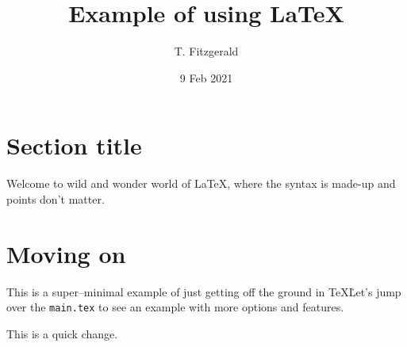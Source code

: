 \documentclass[letterpaper,10pt,twoside]{article}
\title{Example of using \LaTeX}
\date{9 Feb 2021}
\author{T. Fitzgerald}
\begin{document}
\maketitle

\section{Section title}
Welcome to wild and wonder world of \LaTeX , where the syntax is made-up and points don't matter.

\section{Moving on}
This is a super--minimal example of just getting off the ground in \TeX\.  
Let's jump over the  \texttt{main.tex} to see an example with more options and features. 


This is a quick change.
\end{document}

